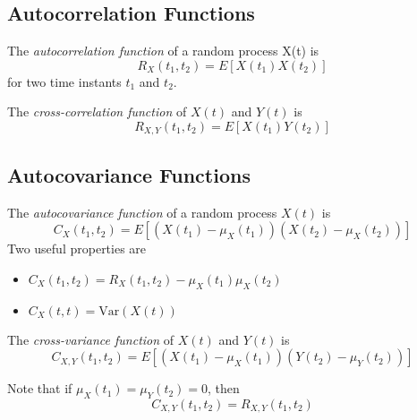 \subsection{Autocorrelation Functions}
The \emph{autocorrelation function} of a
random process X(t) is
\begin{equation}
    R_X(t_1, t_2) = E\left[X(t_1)X(t_2)\right]
\end{equation}
for two time instants $t_1$ and $t_2$.

The \emph{cross-correlation function}
of $X(t)$ and $Y(t)$ is
\begin{equation}
    R_{X,Y}(t_1, t_2) = E[X(t_1)Y(t_2)]
\end{equation}
\subsection{Autocovariance Functions}
The \emph{autocovariance function} of a random
process $X(t)$ is
\begin{equation}
    C_X(t_1, t_2) = E\left[(X(t_1)-\mu_X(t_1))(X(t_2)-\mu_X(t_2))\right]
\end{equation}
Two useful properties are
\begin{itemize}
    \item $C_X(t_1, t_2) = R_X(t_1,t_2) - \mu_X(t_1)\mu_X(t_2)$
    \item $C_X(t, t) = \text{Var}(X(t))$
\end{itemize}

The \emph{cross-variance function} of
$X(t)$ and $Y(t)$ is
\begin{equation}
    C_{X,Y}(t_1, t_2) = E\left[(X(t_1)-\mu_X(t_1))(Y(t_2) - \mu_Y(t_2))\right]
\end{equation}

Note that if $\mu_X(t_1) = \mu_Y(t_2) = 0$, then
\begin{equation}
    C_{X,Y}(t_1, t_2) = R_{X,Y}(t_1, t_2)
\end{equation}